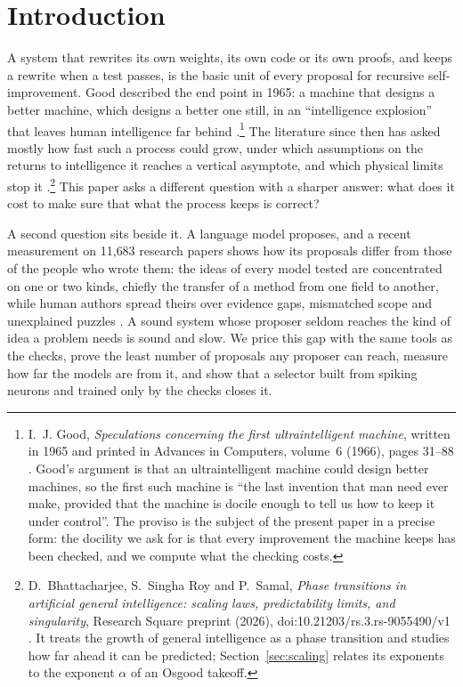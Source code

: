 \section{Introduction}\label{sec:intro}

A system that rewrites its own weights, its own code or its own proofs, and keeps a rewrite when a test passes, is the basic unit of every proposal for recursive self-improvement. Good described the end point in 1965: a machine that designs a better machine, which designs a better one still, in an ``intelligence explosion'' that leaves human intelligence far behind \cite{Goo66}.\footnote{I.~J. Good, \emph{Speculations concerning the first ultraintelligent machine}, written in 1965 and printed in Advances in Computers, volume~6 (1966), pages 31--88 \cite{Goo66}. Good's argument is that an ultraintelligent machine could design better machines, so the first such machine is ``the last invention that man need ever make, provided that the machine is docile enough to tell us how to keep it under control''. The proviso is the subject of the present paper in a precise form: the docility we ask for is that every improvement the machine keeps has been checked, and we compute what the checking costs.} The literature since then has asked mostly how fast such a process could grow, under which assumptions on the returns to intelligence it reaches a vertical asymptote, and which physical limits stop it \cite{Ord26,AOA25,BSS26}.\footnote{D.~Bhattacharjee, S.~Singha Roy and P.~Samal, \emph{Phase transitions in artificial general intelligence: scaling laws, predictability limits, and singularity}, Research Square preprint (2026), doi:10.21203/rs.3.rs-9055490/v1 \cite{BSS26}. It treats the growth of general intelligence as a phase transition and studies how far ahead it can be predicted; Section~\ref{sec:scaling} relates its exponents to the exponent $\alpha$ of an Osgood takeoff.} This paper asks a different question with a sharper answer: what does it cost to make sure that what the process keeps is correct?

A second question sits beside it. A language model proposes, and a recent measurement on 11{,}683 research papers shows how its proposals differ from those of the people who wrote them: the ideas of every model tested are concentrated on one or two kinds, chiefly the transfer of a method from one field to another, while human authors spread theirs over evidence gaps, mismatched scope and unexplained puzzles \cite{CZC26}. A sound system whose proposer seldom reaches the kind of idea a problem needs is sound and slow. We price this gap with the same tools as the checks, prove the least number of proposals any proposer can reach, measure how far the models are from it, and show that a selector built from spiking neurons and trained only by the checks closes it.

